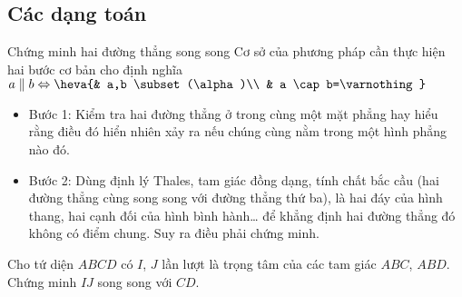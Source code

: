 \subsection{Các dạng toán}
\begin{dang}{Chứng minh hai đường thẳng song song}
Cơ sở của phương pháp cần thực hiện hai bước cơ bản cho định nghĩa $a \parallel b \Leftrightarrow \heva{& a,b \subset (\alpha )\\ & a \cap b=\varnothing}$
\begin{itemize}
\item Bước 1: Kiểm tra hai đường thẳng ở trong cùng một mặt phẳng hay hiểu rằng điều đó hiển nhiên xảy ra nếu chúng cùng nằm trong một hình phẳng nào đó.
\item Bước 2: Dùng định lý Thales, tam giác đồng dạng, tính chất bắc cầu (hai đường thẳng cùng song song với đường thẳng thứ ba), là hai đáy của hình thang, hai cạnh đối của hình bình hành… để khẳng định hai đường thẳng đó không có điểm chung.
Suy ra điều phải chứng minh.
\end{itemize}
\end{dang}
\begin{vd}%
Cho tứ diện $ABCD$ có $I$, $J$ lần lượt là trọng tâm của các tam giác $ABC$, $ABD$. Chứng minh $IJ$ song song với $CD$.
\end{vd}
